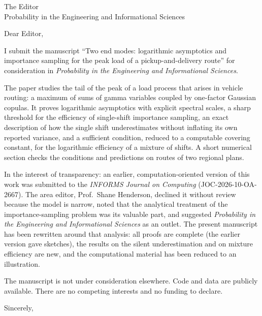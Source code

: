 \documentclass[11pt]{letter}
\begin{document}
\begin{letter}{The Editor\\Probability in the Engineering and Informational Sciences}
\opening{Dear Editor,}

I submit the manuscript ``Two end modes: logarithmic asymptotics and importance
sampling for the peak load of a pickup-and-delivery route'' for consideration in
\emph{Probability in the Engineering and Informational Sciences}.

The paper studies the tail of the peak of a load process that arises in vehicle routing:
a maximum of sums of gamma variables coupled by one-factor Gaussian copulas. It proves
logarithmic asymptotics with explicit spectral scales, a sharp threshold for the
efficiency of single-shift importance sampling, an exact description of how the single
shift underestimates without inflating its own reported variance, and a sufficient
condition, reduced to a computable covering constant, for the logarithmic efficiency of
a mixture of shifts. A short numerical section checks the conditions and predictions on
routes of two regional plans.

In the interest of transparency: an earlier, computation-oriented version of this work
was submitted to the \emph{INFORMS Journal on Computing} (JOC-2026-10-OA-2667). The area
editor, Prof.\ Shane Henderson, declined it without review because the model is narrow,
noted that the analytical treatment of the importance-sampling problem was its valuable
part, and suggested \emph{Probability in the Engineering and Informational Sciences} as
an outlet. The present manuscript has been rewritten around that analysis: all proofs are
complete (the earlier version gave sketches), the results on the silent underestimation
and on mixture efficiency are new, and the computational material has been reduced to an
illustration.

The manuscript is not under consideration elsewhere. Code and data are publicly
available. There are no competing interests and no funding to declare.

\closing{Sincerely,}
\end{letter}
\end{document}
